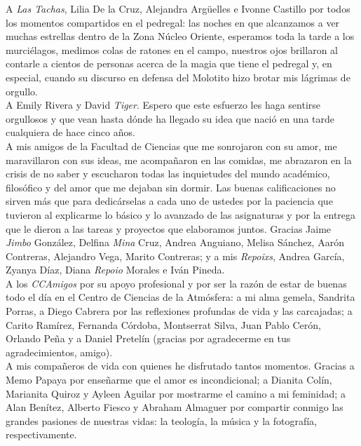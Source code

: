 A \textit{Las Tachas}, Lilia De la Cruz, Alejandra Argüelles e Ivonne Castillo por todos los momentos compartidos en el pedregal: las noches en que alcanzamos a ver muchas estrellas dentro de la Zona Núcleo Oriente, esperamos toda la tarde a los murciélagos, medimos colas de ratones en el campo, nuestros ojos brillaron al contarle a cientos de personas acerca de la magia que tiene el pedregal y, en especial, cuando su discurso en defensa del Molotito hizo brotar mis lágrimas de orgullo.\\ 

A Emily Rivera y David \textit{Tiger}. Espero que este esfuerzo les haga sentirse orgullosos y que vean hasta dónde ha llegado su idea que nació en una tarde cualquiera de hace cinco años.\\

A mis amigos de la Facultad de Ciencias que me sonrojaron con su amor, me maravillaron con sus ideas, me acompañaron en las comidas, me abrazaron en la crisis de no saber y escucharon todas las inquietudes del mundo académico, filosófico y del amor que me dejaban sin dormir. Las buenas calificaciones no sirven más que para dedicárselas a cada uno de ustedes por la paciencia que tuvieron al explicarme lo básico y lo avanzado de las asignaturas y por la entrega que le dieron a las tareas y proyectos que elaboramos juntos. Gracias Jaime \textit{Jimbo} González, Delfina \textit{Mina} Cruz, Andrea Anguiano, Melisa Sánchez, Aarón Contreras, Alejandro Vega, Marito Contreras; y a mis \textit{Repoixs}, Andrea García, Zyanya Díaz, Diana \textit{Repoio} Morales e Iván Pineda.\\

A los \textit{CCAmigos} por su apoyo profesional y por ser la razón de estar de buenas todo el día en el Centro de Ciencias de la Atmósfera: a mi alma gemela, Sandrita Porras, a Diego Cabrera por las reflexiones profundas de vida y las carcajadas; a Carito Ramírez, Fernanda Córdoba, Montserrat Silva, Juan Pablo Cerón, Orlando Peña y a Daniel Pretelín (gracias por agradecerme en tus agradecimientos, amigo).\\

A mis compañeros de vida con quienes he disfrutado tantos momentos. Gracias a Memo Papaya por enseñarme que el amor es incondicional; a Dianita Colín, Marianita Quiroz y Ayleen Aguilar por mostrarme el camino a mi feminidad; a Alan Benítez, Alberto Fiesco y Abraham Almaguer por compartir conmigo las grandes pasiones de nuestras vidas: la teología, la música y la fotografía, respectivamente.\\

